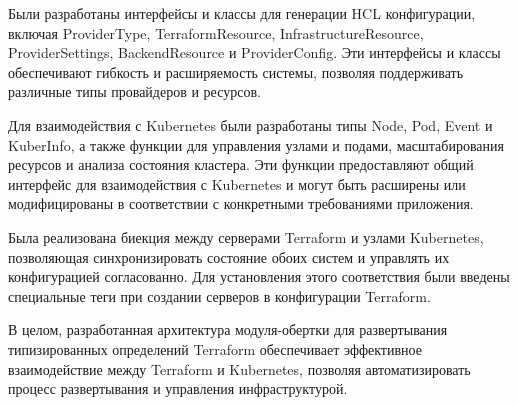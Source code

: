 Были разработаны интерфейсы и классы для генерации HCL конфигурации, включая
ProviderType, TerraformResource, InfrastructureResource, ProviderSettings,
BackendResource и ProviderConfig. Эти интерфейсы и классы обеспечивают гибкость
и расширяемость системы, позволяя поддерживать различные типы провайдеров и
ресурсов.

Для взаимодействия с Kubernetes были разработаны типы Node, Pod, Event и
KuberInfo, а также функции для управления узлами и подами, масштабирования
ресурсов и анализа состояния кластера. Эти функции предоставляют общий интерфейс
для взаимодействия с Kubernetes и могут быть расширены или модифицированы в
соответствии с конкретными требованиями приложения.

Была реализована биекция между серверами Terraform и узлами Kubernetes,
позволяющая синхронизировать состояние обоих систем и управлять их конфигурацией
согласованно. Для установления этого соответствия были введены специальные теги
при создании серверов в конфигурации Terraform.

В целом, разработанная архитектура модуля-обертки для развертывания
типизированных определений Terraform обеспечивает эффективное взаимодействие
между Terraform и Kubernetes, позволяя автоматизировать процесс развертывания и
управления инфраструктурой.